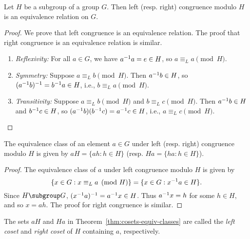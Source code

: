 \begin{theorem}
    Let \(H\) be a subgroup of a group \(G\). Then left (resp. right) congruence
    modulo \(H\) is an equivalence relation on \(G\).
\end{theorem}

\begin{proof}
    We prove that left congruence is an equivalence relation. The proof that
    right congruence is an equivalence relation is similar.

    \begin{enumerate}
        \item \emph{Reflexivity:} For all \(a \in G\), we have \(a^{-1} a = e \in
        H\), so \(a \equiv_L a \pmod{H}\).
        \item \emph{Symmetry:} Suppose \(a \equiv_L b \pmod{H}\). Then \(a^{-1} b
        \in H\), so \((a^{-1} b)^{-1} = b^{-1} a \in H\), i.e., \(b \equiv_L a
        \pmod{H}\).
        \item \emph{Transitivity:} Suppose \(a \equiv_L b \pmod{H}\) and \(b
        \equiv_L c \pmod{H}\). Then \(a^{-1} b \in H\) and \(b^{-1} c \in H\), so
        \((a^{-1} b)(b^{-1} c) = a^{-1} c \in H\), i.e., \(a \equiv_L c \pmod{H}\).
    \end{enumerate}
\end{proof}

\begin{theorem}
    \label{thm:cosets-equiv-classes}
    The equivalence class of an element \(a \in G\) under left (resp. right)
    congruence modulo \(H\) is given by \(aH = \{ah : h \in H\}\) (resp. \(Ha =
    \{ha : h \in H\}\)).
\end{theorem}

\begin{proof}
    The equivalence class of \(a\) under left congruence modulo \(H\) is given
    by
    \[
        \{ x \in G : x \equiv_L a \pmod{H} \} = \{ x \in G : x^{-1} a \in H \}.
    \]
    Since \(H \subgroup G\), \((x^{-1} a)^{-1} = a^{-1} x \in H\). Thus \(a^{-1} x =
    h\) for some \(h \in H\), and so \(x = ah\). The proof for right congruence
    is similar.
\end{proof}

\begin{definition}
    The sets \(aH\) and \(Ha\) in Theorem~\ref{thm:cosets-equiv-classes} are
    called the \emph{left coset} and \emph{right coset} of \(H\) containing
    \(a\), respectively.
\end{definition}

